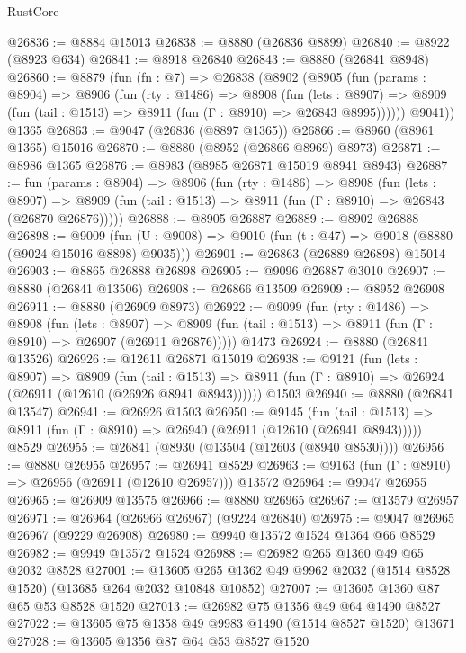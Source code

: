 \begin{lexlean}{RustCore}
\begin{coremodule}
@26836 := @8884 @15013
@26838 := @8880 (@26836 @8899)
@26840 := @8922 (@8923 @634)
@26841 := @8918 @26840
@26843 := @8880 (@26841 @8948)
@26860 := @8879
    (fun (fn : @7) =>
    @26838
      (@8902
        (@8905
          (fun (params : @8904) =>
          @8906
            (fun (rty : @1486) =>
            @8908
              (fun (lets : @8907) =>
              @8909 (fun (tail : @1513) => @8911 (fun (Γ : @8910) => @26843 @8995))))))
        @9041))
    @1365
@26863 := @9047 (@26836 (@8897 @1365))
@26866 := @8960 (@8961 @1365) @15016
@26870 := @8880 (@8952 (@26866 @8969) @8973)
@26871 := @8986 @1365
@26876 := @8983 (@8985 @26871 @15019 @8941 @8943)
@26887 := fun (params : @8904) =>
  @8906
    (fun (rty : @1486) =>
    @8908
      (fun (lets : @8907) =>
      @8909 (fun (tail : @1513) => @8911 (fun (Γ : @8910) => @26843 (@26870 @26876)))))
@26888 := @8905 @26887
@26889 := @8902 @26888
@26898 := @9009
    (fun (U : @9008) => @9010 (fun (t : @47) => @9018 (@8880 (@9024 @15016 @8898) @9035)))
@26901 := @26863 (@26889 @26898) @15014
@26903 := @8865 @26888 @26898
@26905 := @9096 @26887 @3010
@26907 := @8880 (@26841 @13506)
@26908 := @26866 @13509
@26909 := @8952 @26908
@26911 := @8880 (@26909 @8973)
@26922 := @9099
    (fun (rty : @1486) =>
    @8908
      (fun (lets : @8907) =>
      @8909 (fun (tail : @1513) => @8911 (fun (Γ : @8910) => @26907 (@26911 @26876)))))
    @1473
@26924 := @8880 (@26841 @13526)
@26926 := @12611 @26871 @15019
@26938 := @9121
    (fun (lets : @8907) =>
    @8909
      (fun (tail : @1513) =>
      @8911 (fun (Γ : @8910) => @26924 (@26911 (@12610 (@26926 @8941 @8943))))))
    @1503
@26940 := @8880 (@26841 @13547)
@26941 := @26926 @1503
@26950 := @9145
    (fun (tail : @1513) => @8911 (fun (Γ : @8910) => @26940 (@26911 (@12610 (@26941 @8943)))))
    @8529
@26955 := @26841 (@8930 (@13504 (@12603 (@8940 @8530))))
@26956 := @8880 @26955
@26957 := @26941 @8529
@26963 := @9163 (fun (Γ : @8910) => @26956 (@26911 (@12610 @26957))) @13572
@26964 := @9047 @26955
@26965 := @26909 @13575
@26966 := @8880 @26965
@26967 := @13579 @26957
@26971 := @26964 (@26966 @26967) (@9224 @26840)
@26975 := @9047 @26965 @26967 (@9229 @26908)
@26980 := @9940 @13572 @1524 @1364 @66 @8529
@26982 := @9949 @13572 @1524
@26988 := @26982 @265 @1360 @49 @65 @2032 @8528
@27001 := @13605 @265 @1362 @49 @9962 @2032 (@1514 @8528 @1520) (@13685 @264 @2032 @10848 @10852)
@27007 := @13605 @1360 @87 @65 @53 @8528 @1520
@27013 := @26982 @75 @1356 @49 @64 @1490 @8527
@27022 := @13605 @75 @1358 @49 @9983 @1490 (@1514 @8527 @1520) @13671
@27028 := @13605 @1356 @87 @64 @53 @8527 @1520

\end{coremodule}
\end{lexlean}
